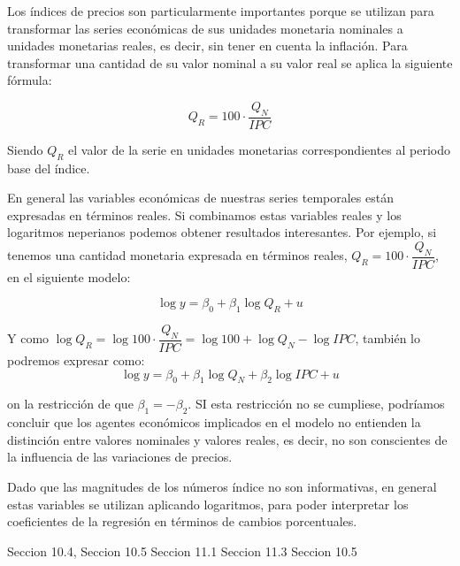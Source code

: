 Los \'indices de precios son particularmente importantes porque se utilizan para transformar las series econ\'omicas de sus unidades monetaria nominales a unidades monetarias reales, es decir, sin tener en cuenta la inflaci\'on. Para transformar una cantidad de su valor nominal a su valor real se aplica la siguiente f\'ormula:

\[Q_R=100\cdot\dfrac{Q_N}{IPC}\]

Siendo $Q_R$ el valor de la serie en unidades monetarias correspondientes al periodo base del \'indice.

En general las variables econ\'omicas de nuestras series temporales est\'an expresadas en t\'erminos reales. Si combinamos estas variables reales y los logaritmos neperianos podemos obtener resultados interesantes. Por ejemplo, si tenemos una cantidad monetaria expresada en t\'erminos reales, $Q_R=100\cdot\dfrac{Q_N}{IPC}$, en el siguiente modelo:

\[\log{y}=\beta_0+\beta_1\log{Q_R}+u\]

Y como $\log{Q_R}=\log{100\cdot\dfrac{Q_N}{IPC}}=\log{100}+\log{Q_N}-\log{IPC}$, tambi\'en lo podremos expresar como:
\[\log{y}=\beta_0+\beta_1\log{Q_N}+\beta_2\log{IPC}+u\]

on la restricci\'on de que $\beta_1=-\beta_2$. SI esta restricci\'on no se cumpliese, podr\'iamos concluir que los agentes econ\'omicos implicados en el modelo no entienden la distinci\'on entre valores nominales y valores reales, es decir, no son conscientes de la influencia de las variaciones de precios.

Dado que las magnitudes de los n\'umeros \'indice no son informativas, en general estas variables se utilizan aplicando logaritmos, para poder interpretar los coeficientes de la regresi\'on en t\'erminos de cambios porcentuales.

Seccion 10.4, 
Seccion 10.5
Seccion 11.1
Seccion 11.3
Seccion 10.5